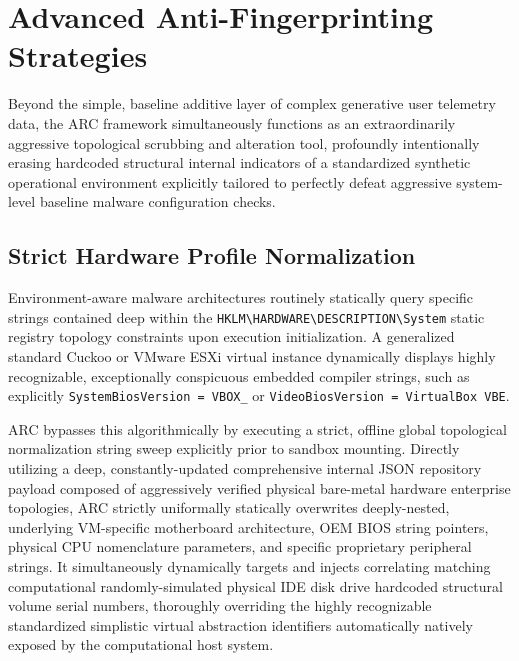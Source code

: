 \documentclass{ieeeaccess}
\begin{document}
\section{Advanced Anti-Fingerprinting Strategies}

Beyond the simple, baseline additive layer of complex generative user telemetry data, the ARC framework simultaneously functions as an extraordinarily aggressive topological scrubbing and alteration tool, profoundly intentionally erasing hardcoded structural internal indicators of a standardized synthetic operational environment explicitly tailored to perfectly defeat aggressive system-level baseline malware configuration checks.

\subsection{Strict Hardware Profile Normalization}
Environment-aware malware architectures routinely statically query specific strings contained deep within the \texttt{HKLM\textbackslash HARDWARE\textbackslash DESCRIPTION\textbackslash System} static registry topology constraints upon execution initialization. A generalized standard Cuckoo or VMware ESXi virtual instance dynamically displays highly recognizable, exceptionally conspicuous embedded compiler strings, such as explicitly \texttt{SystemBiosVersion = VBOX\_} or \texttt{VideoBiosVersion = VirtualBox VBE}. 

ARC bypasses this algorithmically by executing a strict, offline global topological normalization string sweep explicitly prior to sandbox mounting. Directly utilizing a deep, constantly-updated comprehensive internal JSON repository payload composed of aggressively verified physical bare-metal hardware enterprise topologies, ARC strictly uniformally statically overwrites deeply-nested, underlying VM-specific motherboard architecture, OEM BIOS string pointers, physical CPU nomenclature parameters, and specific proprietary peripheral strings. It simultaneously dynamically targets and injects correlating matching computational randomly-simulated physical IDE disk drive hardcoded structural volume serial numbers, thoroughly overriding the highly recognizable standardized simplistic virtual abstraction identifiers automatically natively exposed by the computational host system.
\end{document}
